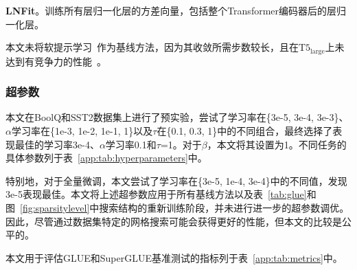 \noindent\textbf{LNFit}。训练所有层归一化层的方差向量，包括整个Transformer编码器后的层归一化层。

本文未将软提示学习~\cite{lester2021power}作为基线方法，因为其收敛所需步数较长，且在$\text{T}5_{\text{large}}$上未达到有竞争力的性能~\cite{lester2021power}。


\subsubsection{超参数}
\label{app:hyperparameters}
本文在BoolQ和SST2数据集上进行了预实验，尝试了学习率在\{3e-5, 3e-4, 3e-3\}、$\alpha$学习率在\{1e-3, 1e-2, 1e-1, 1\}以及$\tau$在\{0.1, 0.3, 1\}中的不同组合，最终选择了表现最佳的学习率3e-4、$\alpha$学习率0.1和$\tau$=1。对于$\beta$，本文将其设置为1。不同任务的具体参数列于表~\ref{app:tab:hyperparameters}中。

特别地，对于全量微调，本文尝试了学习率在\{3e-5, 1e-4, 3e-4\}中的不同值，发现3e-5表现最佳。本文将上述超参数应用于所有基线方法以及表~\ref{tab:glue}和图~\ref{fig:sparsitylevel}中搜索结构的重新训练阶段，并未进行进一步的超参数调优。因此，尽管通过数据集特定的网格搜索可能会获得更好的性能，但本文的比较是公平的。

本文用于评估GLUE和SuperGLUE基准测试的指标列于表~\ref{app:tab:metrics}中。

